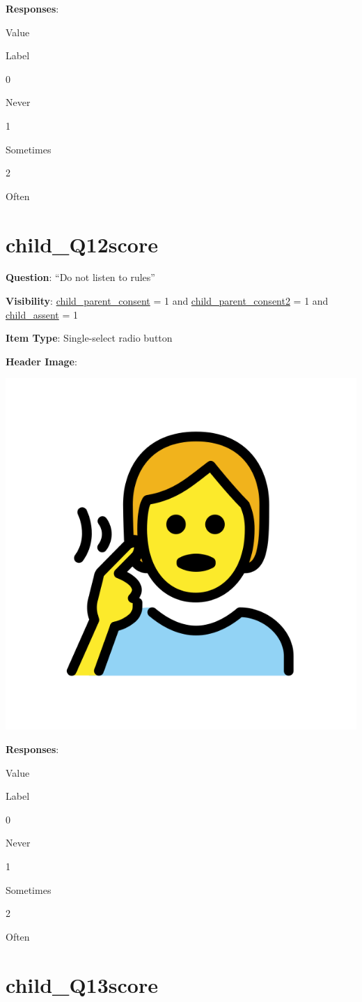 \documentclass[]{book}
\begin{document}
\textbf{Responses}:

Value

Label

0

Never

1

Sometimes

2

Often

\hypertarget{child_q12score}{%
\section{child\_Q12score}\label{child_q12score}}

\textbf{Question}: ``Do not listen to rules''

\textbf{Visibility}: \protect\hyperlink{child_parent_consent}{child\_parent\_consent} = 1 and \protect\hyperlink{child_parent_consent2}{child\_parent\_consent2} = 1 and \protect\hyperlink{child_assent}{child\_assent} = 1

\textbf{Item Type}: Single-select radio button

\textbf{Header Image}:

\begin{flushleft}\includegraphics[width=0.33\linewidth]{downloadFigs4latex_HBN_PMHS_Codebook/child_Q12score_headerImg} \end{flushleft}

\textbf{Responses}:

Value

Label

0

Never

1

Sometimes

2

Often

\hypertarget{child_q13score}{%
\section{child\_Q13score}\label{child_q13score}}
\end{document}
